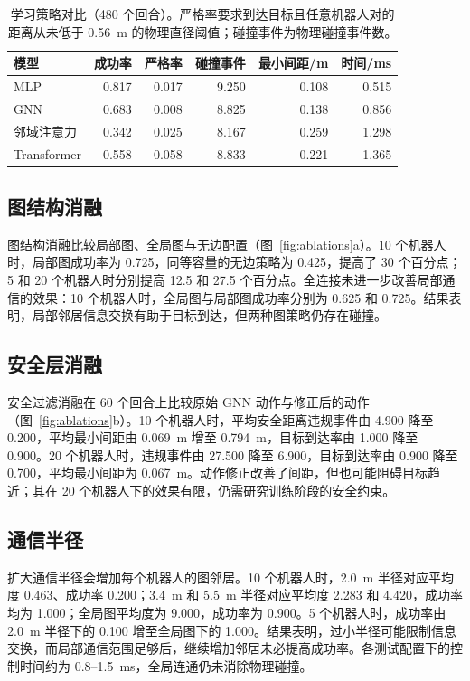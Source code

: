 \documentclass[conference]{IEEEtran}
\begin{document}
\begin{table}[t]
\caption{学习策略对比（480 个回合）。严格率要求到达目标且任意机器人对的距离从未低于 0.56~m 的物理直径阈值；碰撞事件为物理碰撞事件数。}
\label{tab:learned}
\centering
\footnotesize
\setlength{\tabcolsep}{3pt}
\begin{tabular}{lrrrrr}
\toprule
模型 & 成功率 & 严格率 & 碰撞事件 & 最小间距/m & 时间/ms\\
\midrule
MLP        & 0.817 & 0.017 & 9.250 & 0.108 & 0.515 \\
GNN        & 0.683 & 0.008 & 8.825 & 0.138 & 0.856 \\
邻域注意力 & 0.342 & 0.025 & 8.167 & 0.259 & 1.298 \\
Transformer & 0.558 & 0.058 & 8.833 & 0.221 & 1.365 \\
\bottomrule
\end{tabular}
\end{table}

\subsection{图结构消融}
图结构消融比较局部图、全局图与无边配置（图~\ref{fig:ablations}a）。10 个机器人时，局部图成功率为 0.725，同等容量的无边策略为 0.425，提高了 30 个百分点；5 和 20 个机器人时分别提高 12.5 和 27.5 个百分点。全连接未进一步改善局部通信的效果：10 个机器人时，全局图与局部图成功率分别为 0.625 和 0.725。结果表明，局部邻居信息交换有助于目标到达，但两种图策略仍存在碰撞。

\subsection{安全层消融}
安全过滤消融在 60 个回合上比较原始 GNN 动作与修正后的动作（图~\ref{fig:ablations}b）。10 个机器人时，平均安全距离违规事件由 4.900 降至 0.200，平均最小间距由 0.069~m 增至 0.794~m，目标到达率由 1.000 降至 0.900。20 个机器人时，违规事件由 27.500 降至 6.900，目标到达率由 0.900 降至 0.700，平均最小间距为 0.067~m。动作修正改善了间距，但也可能阻碍目标趋近；其在 20 个机器人下的效果有限，仍需研究训练阶段的安全约束。

\subsection{通信半径}
扩大通信半径会增加每个机器人的图邻居。10 个机器人时，2.0~m 半径对应平均度 0.463、成功率 0.200；3.4~m 和 5.5~m 半径对应平均度 2.283 和 4.420，成功率均为 1.000；全局图平均度为 9.000，成功率为 0.900。5 个机器人时，成功率由 2.0~m 半径下的 0.100 增至全局图下的 1.000。结果表明，过小半径可能限制信息交换，而局部通信范围足够后，继续增加邻居未必提高成功率。各测试配置下的控制时间约为 0.8--1.5~ms，全局连通仍未消除物理碰撞。
\end{document}
